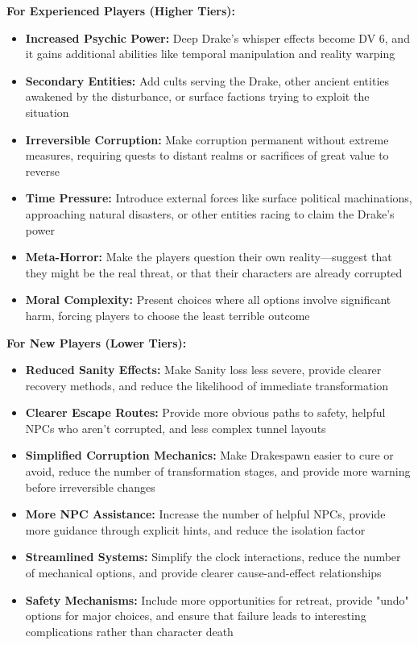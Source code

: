 \documentclass[11pt]{article}
\begin{document}
\textbf{For Experienced Players (Higher Tiers):}
\begin{itemize}
\item \textbf{Increased Psychic Power:} Deep Drake's whisper effects become DV 6, and it gains additional abilities like temporal manipulation and reality warping
\item \textbf{Secondary Entities:} Add cults serving the Drake, other ancient entities awakened by the disturbance, or surface factions trying to exploit the situation
\item \textbf{Irreversible Corruption:} Make corruption permanent without extreme measures, requiring quests to distant realms or sacrifices of great value to reverse
\item \textbf{Time Pressure:} Introduce external forces like surface political machinations, approaching natural disasters, or other entities racing to claim the Drake's power
\item \textbf{Meta-Horror:} Make the players question their own reality—suggest that they might be the real threat, or that their characters are already corrupted
\item \textbf{Moral Complexity:} Present choices where all options involve significant harm, forcing players to choose the least terrible outcome
\end{itemize}

\textbf{For New Players (Lower Tiers):}
\begin{itemize}
\item \textbf{Reduced Sanity Effects:} Make Sanity loss less severe, provide clearer recovery methods, and reduce the likelihood of immediate transformation
\item \textbf{Clearer Escape Routes:} Provide more obvious paths to safety, helpful NPCs who aren't corrupted, and less complex tunnel layouts
\item \textbf{Simplified Corruption Mechanics:} Make Drakespawn easier to cure or avoid, reduce the number of transformation stages, and provide more warning before irreversible changes
\item \textbf{More NPC Assistance:} Increase the number of helpful NPCs, provide more guidance through explicit hints, and reduce the isolation factor
\item \textbf{Streamlined Systems:} Simplify the clock interactions, reduce the number of mechanical options, and provide clearer cause-and-effect relationships
\item \textbf{Safety Mechanisms:} Include more opportunities for retreat, provide "undo" options for major choices, and ensure that failure leads to interesting complications rather than character death
\end{itemize}
\end{document}
